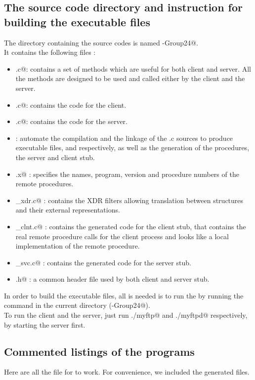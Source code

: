 \documentclass{article}
\begin{document}
\subsection{The source code directory and instruction for building the executable files}
The directory containing the source codes is named -Group24@.  \\
It contains the following files : 
\begin{itemize}
\item \verb@utils.c@: contains a set of methods which are useful for both client and server. All the methods are designed to be used and called either by the client and the server. 
\item \verb@myftp.c@: contains the code for the client.
\item \verb@myftpd.c@: contains the code for the server.
\item \verb@Makefile@: automate the compilation and the linkage of the .c sources to produce executable files, \verb@myftp@ and \verb@myftpd@ respectively, as well as the generation of the \verb@XDR@ procedures, the server and client stub.
\item \verb@rpspec.x@ : specifies the names, program, version and procedure numbers of the remote procedures.
\item \verb@rpspec_xdr.c@ : contains the XDR filters allowing translation between structures and their external representations.
\item \verb@rpspec_clnt.c@ : contains the generated code for the client stub, that contains the real remote procedure calls for the client process and looks like a local implementation of the remote procedure.
\item \verb@rpspec_svc.c@ : contains the generated code for the server stub.
\item \verb@rpspec.h@ : a common header file used by both client and server stub.
\end{itemize}
In order to build the executable files, all is needed is to run the \verb@Makefile@ by running the \verb@make@ command in the current directory (-Group24@).\\

To run the client and the server, just run \verb@./myftp@ and \verb@./myftpd@ respectively, by starting the server first.
\subsection{Commented listings of the programs}
Here are all the file for \verb@myftp@ to work. For convenience, we included the generated files.
\end{document}
